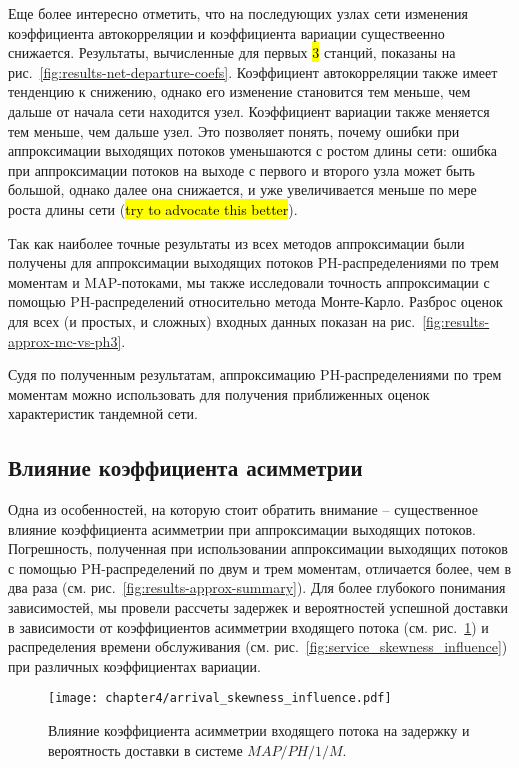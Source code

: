 Еще более интересно отметить, что на последующих узлах сети изменения коэффициента автокорреляции и коэффициента вариации существеенно снижается. Результаты, вычисленные для первых \hl{3} станций, показаны на рис.~\ref{fig:results-net-departure-coefs}. Коэффициент автокорреляции также имеет тенденцию к снижению, однако его изменение становится тем меньше, чем дальше от начала сети находится узел. Коэффициент вариации также меняется тем меньше, чем дальше узел. Это позволяет понять, почему ошибки при аппроксимации выходящих потоков уменьшаются с ростом длины сети: ошибка при аппроксимации потоков на выходе с первого и второго узла может быть большой, однако далее она снижается, и уже увеличивается меньше по мере роста длины сети (\hl{try to advocate this better}).

Так как наиболее точные результаты из всех методов аппроксимации были получены для аппроксимации выходящих потоков PH-распределениями по трем моментам и MAP-потоками, мы также исследовали точность аппроксимации с помощью PH-распределений относительно метода Монте-Карло. Разброс оценок для всех (и простых, и сложных) входных данных показан на рис.~\ref{fig:results-approx-mc-vs-ph3}.

Судя по полученным результатам, аппроксимацию PH-распределениями по трем моментам можно использовать для получения приближенных оценок характеристик тандемной сети.


\subsection{Влияние коэффициента асимметрии}

Одна из особенностей, на которую стоит обратить внимание -- существенное влияние коэффициента асимметрии при аппроксимации выходящих потоков. Погрешность, полученная при использовании аппроксимации выходящих потоков с помощью PH-распределений по двум и трем моментам, отличается более, чем в два раза (см. рис.~\ref{fig:results-approx-summary}). Для более глубокого понимания зависимостей, мы провели рассчеты задержек и вероятностей успешной доставки в зависимости от коэффициентов асимметрии входящего потока (см. рис.~\ref{fig:arrival_skewness_influence}) и распределения времени обслуживания (см. рис.~\ref{fig:service_skewness_influence}) при различных коэффициентах вариации.

\begin{figure}[h]
    \texttt{[image: chapter4/arrival\_skewness\_influence.pdf]}
    \caption{Влияние коэффициента асимметрии входящего потока на задержку и вероятность доставки в системе $MAP/PH/1/M$.}\label{fig:arrival_skewness_influence}
\end{figure}


